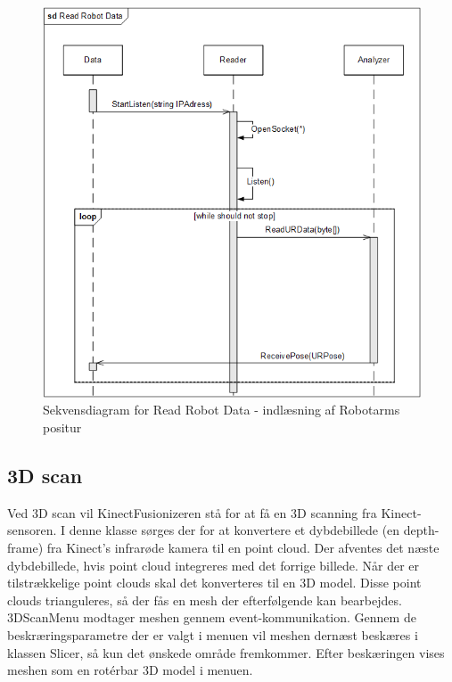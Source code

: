 \begin{figure}[H]
    \centering
    \includegraphics[width=1\textwidth]{figurer/d/Design/Sequence/sd_reading}
    \caption{Sekvensdiagram for Read Robot Data - indlæsning af Robotarms positur}
    \label{sd_reading}
\end{figure}

\subsection{3D scan}
Ved 3D scan vil KinectFusionizeren stå for at få en 3D scanning fra Kinect-sensoren. I denne klasse sørges der for at konvertere et dybdebillede (en depth-frame) fra Kinect's infrarøde kamera til en point cloud. Der afventes det næste dybdebillede, hvis point cloud integreres med det forrige billede. Når der er tilstrækkelige point clouds skal det konverteres til en 3D model.  Disse point clouds trianguleres, så der fås en mesh der efterfølgende kan bearbejdes. 3DScanMenu modtager meshen gennem event-kommunikation.
Gennem de beskræringsparametre der er valgt i menuen vil meshen dernæst beskæres i klassen Slicer, så kun det ønskede område fremkommer. Efter beskæringen vises meshen som en rotérbar 3D model i menuen.

